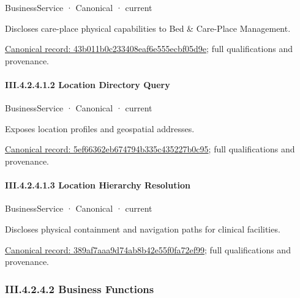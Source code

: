 \label{element:43b011b0c233408eaf6e555ecbf05d9e}
{\small BusinessService · Canonical · current}\par

Discloses care-place physical capabilities to Bed \& Care-Place Management.


{\footnotesize \href{../../../../continuum/business/business-service/43b011b0c233408eaf6e555ecbf05d9e.md}{Canonical record: 43b011b0c233408eaf6e555ecbf05d9e}; full qualifications and provenance.}\par
\paragraph*{III.4.2.4.1.2 Location Directory Query}
\label{navigation:III.4.2.4.1.2}

\label{element:5ef66362eb674794b335c435227b0c95}
{\small BusinessService · Canonical · current}\par

Exposes location profiles and geospatial addresses.


{\footnotesize \href{../../../../continuum/business/business-service/5ef66362eb674794b335c435227b0c95.md}{Canonical record: 5ef66362eb674794b335c435227b0c95}; full qualifications and provenance.}\par
\paragraph*{III.4.2.4.1.3 Location Hierarchy Resolution}
\label{navigation:III.4.2.4.1.3}

\label{element:389af7aaa9d74ab8b42e55f0fa72ef99}
{\small BusinessService · Canonical · current}\par

Discloses physical containment and navigation paths for clinical facilities.


{\footnotesize \href{../../../../continuum/business/business-service/389af7aaa9d74ab8b42e55f0fa72ef99.md}{Canonical record: 389af7aaa9d74ab8b42e55f0fa72ef99}; full qualifications and provenance.}\par
\subsubsection*{III.4.2.4.2 Business Functions}
\label{navigation:III.4.2.4.2}

